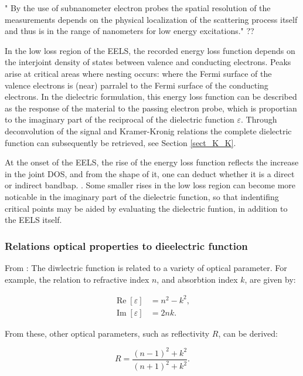 "
By the use of subnanometer electron probes the spatial resolution of the measurements depends on the physical localization of the scattering process itself and thus is in the range of nanometers for low energy excitations." ?? 


In the low loss region of the EELS, the recorded energy loss function depends on the interjoint density of states between valence and conducting electrons. Peaks arise at critical areas where nesting occurs: where the Fermi surface of the valence electrons is (near) parralel to the Fermi surface of the conducting electrons. In the dielectric formulation, this energy loss function can be described as the response of the material to the passing electron probe, which is proportian to the imaginary part of the reciprocal of the dielectric function $\varepsilon$. Through deconvolution of the signal and Kramer-Kronig relations the complete dielectric function can subsequently be retrieved, see Section \ref{sect_K_K}.

At the onset of the EELS, the rise of the energy loss function reflects the increase in the joint DOS, and from the shape of it, one can deduct whether it is a direct or indirect bandbap. \cite{denk betere ref,check lau}. Some smaller rises in the low loss region can become more noticable in the imaginary part of the dielectric function, so that indentifing critical points may be aided by evaluating the dielectric funtion, in addition to the EELS itself.



\subsubsection{Relations optical properties to dieelectric function}
From \cite{brockt_lakner_2000}:
The diwlectric function is related to a variety of optical parameter. For example, the relation to refractive index $n$, and absorbtion index $k$, are given by:

\begin{equation}
\begin{aligned}
	\operatorname{Re}[\varepsilon]&=n^{2}-k^{2},\\
	\operatorname{Im}[\varepsilon]&=2 n k.
\end{aligned}
\end{equation}

From these, other optical parameters, such as reflectivity $R$, can be derived:

\begin{equation}
R=\frac{(n-1)^{2}+k^{2}}{(n+1)^{2}+k^{2}}.
\end{equation}
